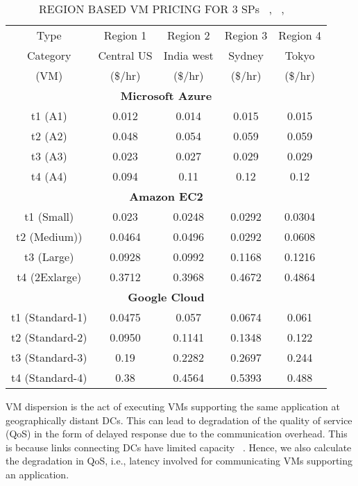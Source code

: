 \documentclass[conference]{IEEEtran}
\newcommand\tab[1][0.8cm]{\hspace*{#1}}
\begin{document}
\begin{table}[htbp!]
	\caption{REGION BASED VM PRICING FOR 3 SPs ~\cite{b5}, ~\cite{b6}, ~\cite{b7}}
	\begin{center}
		\begin{tabular}{c|c|c|c|c}
			\hline
			Type & Region 1 & Region 2 & Region 3 & Region 4\\
			Category & Central US & India west & Sydney & Tokyo\\
			(VM) & (\$/hr) & (\$/hr) & (\$/hr) & (\$/hr)\\
			\hline
		\multicolumn{5}{c}{	\textbf{Microsoft Azure}}\\
		\hline
		t1 (A1) & 0.012 & 0.014 & 0.015 & 0.015\\
		t2 (A2) & 0.048 & 0.054 & 0.059 & 0.059\\
		t3 (A3) & 0.023 & 0.027 & 0.029 & 0.029\\
		t4 (A4) & 0.094 & 0.11 & 0.12 & 0.12\\
		\hline
		\multicolumn{5}{c}{	\textbf{Amazon EC2}}\\
		\hline
		t1 (Small) & 0.023 & 0.0248 & 0.0292 & 0.0304\\
		t2 (Medium)) & 0.0464 & 0.0496 & 0.0292 & 0.0608\\
		t3 (Large) & 0.0928 & 0.0992 & 0.1168 & 0.1216\\
		t4 (2Exlarge) & 0.3712 & 0.3968 & 0.4672 & 0.4864\\
		\hline
		\multicolumn{5}{c}{	\textbf{Google Cloud}}\\
		\hline
		t1 (Standard-1) & 0.0475 & 0.057 & 0.0674 & 0.061\\
		t2 (Standard-2) & 0.0950 & 0.1141 & 0.1348 & 0.122\\
		t3 (Standard-3) & 0.19 & 0.2282 & 0.2697 & 0.244\\
		t4 (Standard-4) & 0.38 & 0.4564 & 0.5393 & 0.488\\
		\hline
		\end{tabular}
		\label{tab1}
	\end{center}
\end{table}
\newline
\tab VM dispersion is the act of executing VMs supporting the
same application at geographically distant DCs. This can lead
to degradation of the quality of service (QoS) in the form of
delayed response due to the communication overhead. This
is because links connecting DCs have limited capacity ~\cite{b5}.
Hence, we also calculate the degradation in QoS, i.e., latency
involved for communicating VMs supporting an application.
\end{document}
